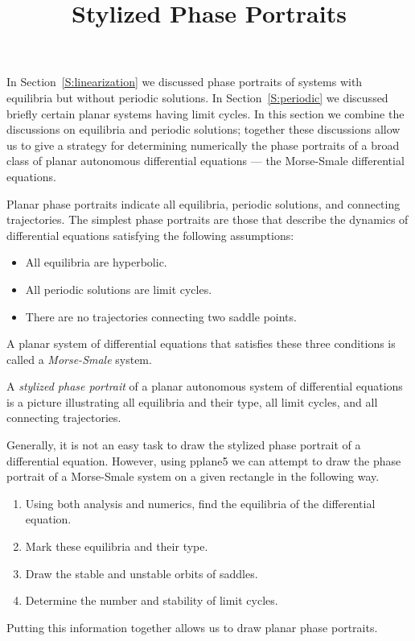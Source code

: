 \documentclass{ximera}
\title{Stylized Phase Portraits}
\begin{document}
\begin{abstract}
\end{abstract}
\maketitle

  \label{S:SPP}


In Section~\ref{S:linearization} we discussed phase portraits of systems with 
equilibria but without periodic solutions.  In Section~\ref{S:periodic} we 
discussed briefly certain planar systems having limit cycles.  In this 
section we combine the discussions on equilibria and periodic solutions; 
together these discussions allow us to give a strategy for determining 
numerically the phase portraits of a broad class of planar autonomous 
differential equations --- the Morse-Smale differential equations.
 
Planar phase portraits indicate all equilibria, periodic
solutions, and connecting trajectories.  The simplest phase
portraits are those that describe the dynamics of differential
equations satisfying the following assumptions: 
\begin{itemize}
\item	All equilibria are hyperbolic.
\item	All periodic solutions are limit cycles.
\item	There are no trajectories connecting two saddle points.
\end{itemize}
A planar system of differential equations that satisfies these
three conditions is called a {\em Morse-Smale\/} system.  

\begin{definition} \label{D:stylized}
A {\em stylized phase portrait\/} of a planar autonomous system
of differential equations is a picture illustrating all
equilibria and their type, all limit cycles, and all connecting
trajectories.
\end{definition}

Generally, it is not an easy task to draw the stylized phase
portrait of a differential equation.  However, using {\sf pplane5\/} 
we can attempt to draw the phase portrait of a
Morse-Smale system on a given rectangle in the following way.
\begin{enumerate}
\item Using both analysis and numerics, find the equilibria of
the differential equation.
\item Mark these equilibria and their type.  
\item Draw the stable and unstable orbits of saddles.  
\item Determine the number and stability of limit cycles.  
\end{enumerate}
Putting this information together allows us to draw planar phase
portraits.
\end{document}
